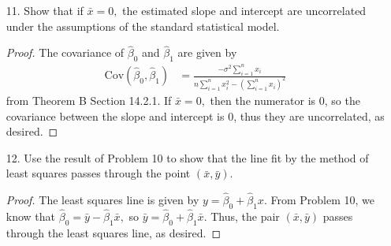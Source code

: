 \documentclass{article}
\newcommand{\cov}{\mathrm{Cov}}
\begin{document}
\begin{itemize}
	\item[11.] Show that if $\bar x=0,$ the estimated slope and intercept are uncorrelated under the assumptions of the standard statistical model.
		\begin{proof}
			The covariance of $\hat\beta_0$ and $\hat\beta_1$ are given by
			\begin{align*}
				\cov(\hat\beta_0, \hat\beta_1) &= \frac{-\displaystyle\sigma^2\sum_{i=1}^{n} x_i}{\displaystyle n\sum_{i=1}^{n} x_i^2-\left( \sum_{i=1}^{n} x_i \right)^2}
			\end{align*}
			from Theorem B Section 14.2.1. If $\bar x=0,$ then the numerator is 0, so the covariance between the slope and intercept is 0, thus they are uncorrelated, as desired.	
		\end{proof}

	\item[12.] Use the result of Problem 10 to show that the line fit by the method of least squares passes through the point $(\bar x, \bar y).$
		\begin{proof}
			The least squares line is given by $y=\hat\beta_0+\hat\beta_1x.$ From Problem 10, we know that $\hat\beta_0=\bar y-\hat\beta_1\bar x,$ so $\bar y=\hat\beta_0+\hat\beta_1\bar x.$ Thus, the pair $(\bar x, \bar y)$ passes through the least squares line, as desired.
		\end{proof}


\end{itemize}
\end{document}
